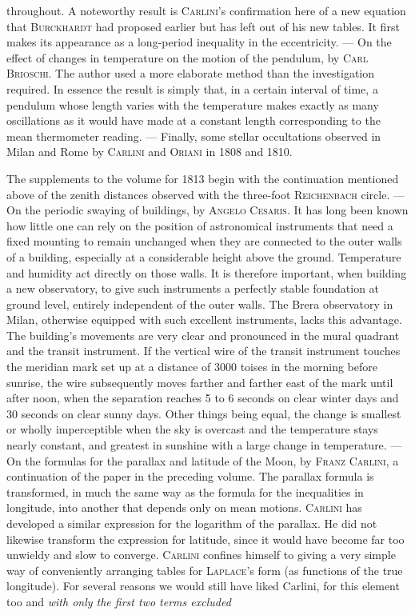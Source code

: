 throughout. A noteworthy result is \textsc{Carlini}'s confirmation here of a new equation that \textsc{Burckhardt} had proposed earlier but has left out of his new tables. It first makes its appearance as a long-period inequality in the eccentricity. --- On the effect of changes in temperature on the motion of the pendulum, by \textsc{Carl Brioschi}. The author used a more elaborate method than the investigation required. In essence the result is simply that, in a certain interval of time, a pendulum whose length varies with the temperature makes exactly as many oscillations as it would have made at a constant length corresponding to the mean thermometer reading. --- Finally, some stellar occultations observed in Milan and Rome by \textsc{Carlini} and \textsc{Oriani} in 1808 and 1810.

The supplements to the volume for 1813 begin with the continuation mentioned above of the zenith distances observed with the three-foot \textsc{Reichenbach} circle. --- On the periodic swaying of buildings, by \textsc{Angelo Cesaris}. It has long been known how little one can rely on the position of astronomical instruments that need a fixed mounting to remain unchanged when they are connected to the outer walls of a building, especially at a considerable height above the ground. Temperature and humidity act directly on those walls. It is therefore important, when building a new observatory, to give such instruments a perfectly stable foundation at ground level, entirely independent of the outer walls. The Brera observatory in Milan, otherwise equipped with such excellent instruments, lacks this advantage. The building's movements are very clear and pronounced in the mural quadrant and the transit instrument. If the vertical wire of the transit instrument touches the meridian mark set up at a distance of 3000 toises in the morning before sunrise, the wire subsequently moves farther and farther east of the mark until after noon, when the separation reaches 5 to 6 seconds on clear winter days and 30 seconds on clear sunny days. Other things being equal, the change is smallest or wholly imperceptible when the sky is overcast and the temperature stays nearly constant, and greatest in sunshine with a large change in temperature. --- On the formulas for the parallax and latitude of the Moon, by \textsc{Franz Carlini}, a continuation of the paper in the preceding volume. The parallax formula is transformed, in much the same way as the formula for the inequalities in longitude, into another that depends only on mean motions. \textsc{Carlini} has developed a similar expression for the logarithm of the parallax. He did not likewise transform the expression for latitude, since it would have become far too unwieldy and slow to converge. \textsc{Carlini} confines himself to giving a very simple way of conveniently arranging tables for \textsc{Laplace}'s form (as functions of the true longitude). For several reasons we would still have liked Carlini, for this element too and \emph{with only the first two terms excluded}

